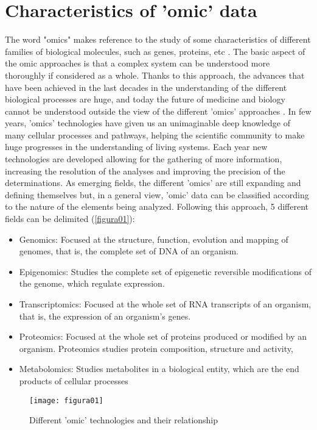 \section{Characteristics of 'omic' data}
\label{sec:charomicdata}
The word "omics" makes reference to the study of some characteristics of different families of biological molecules, such as genes, proteins, etc \parencite{palsson2002silico}. The basic aspect of the omic approaches is that a complex system can be understood more thoroughly if considered as a whole. Thanks to this approach, the advances that have been achieved in the last decades in the understanding of the different biological processes are huge, and today the future of medicine and biology cannot be understood outside the view of the different 'omics' approaches \parencite{van2018role}. In few years, 'omics' technologies have given us an unimaginable deep knowledge of many cellular processes and pathways, helping the scientific community to make huge progresses in the understanding of living systems. Each year new technologies are developed allowing for the gathering of more information, increasing the resolution of the analyses and improving the precision of the determinations. As emerging fields, the different 'omics' are still expanding and defining themselves but, in a general view, 'omic' data can be classified according to the nature of the elements being analyzed. Following this approach, 5 different fields can be delimited (\autoref{figura01}):

\begin{itemize}
    \item Genomics: Focused at the structure, function, evolution and mapping of genomes, that is, the complete set of DNA of an organism.
    \item Epigenomics: Studies the complete set of epigenetic reversible modifications of the genome, which regulate expression.
    \item Transcriptomics: Focused at the whole set of RNA transcripts of an organism, that is, the expression of an organism's genes.
    \item Proteomics: Focused at the whole set of proteins produced or modified by an organism. Proteomics studies protein composition, structure and activity,
    \item Metabolomics: Studies metabolites in a biological entity, which are the end products of cellular processes
\end{itemize}

\begin{figure}[htbp]\centering
		\texttt{[image: figura01]}
		\caption{Different 'omic' technologies and their relationship}
		\label{figura01}
	\end{figure}

